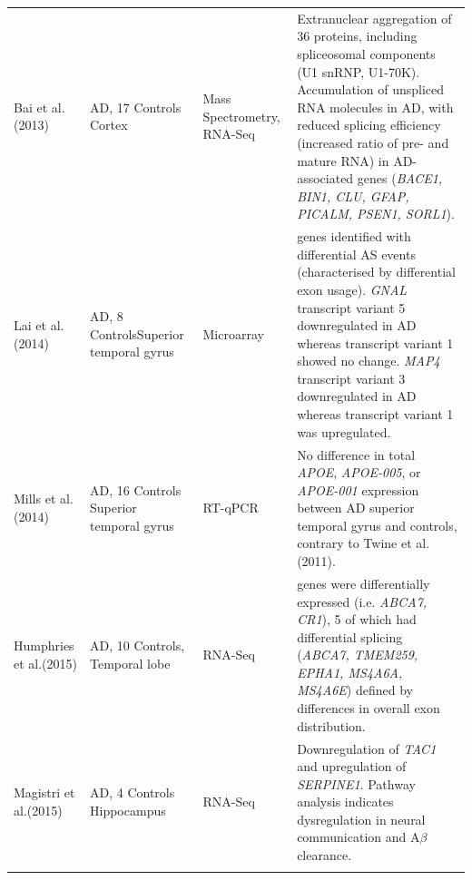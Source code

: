 \begin{landscape}
\begin{longtable}[c]{p{3cm}p{4cm}p{3cm}p{16cm}}
		\centering Bai et al. \newline(2013)\cite{Bai2013} &
		\centering 18 AD, 17 Controls \newline Cortex &
		\centering Mass Spectrometry, RNA-Seq &
		\tabitem Extranuclear aggregation of 36 proteins, including spliceosomal components (U1 snRNP, U1-70K). \newline
		\tabitem Accumulation of unspliced RNA molecules in AD, with reduced splicing efficiency (increased ratio of pre- and mature RNA) in AD-associated genes (\textit{BACE1, BIN1, CLU, GFAP, PICALM, PSEN1, SORL1}).  \\
		\hdashline[0.5pt/5pt]
		
		\centering  Lai et al. \newline(2014)\cite{Lai2014} &
		\centering 8 AD, 8 Controls\newline Superior temporal gyrus &
		\centering Microarray &
		\tabitem 22 genes identified with differential AS events (characterised by differential exon usage). \newline  
		\tabitem \textit{GNAL} transcript variant 5 downregulated in AD whereas transcript variant 1 showed no change. \newline 
		\tabitem \textit{MAP4} transcript variant 3 downregulated in AD whereas transcript variant 1 was upregulated.\\
		\hdashline[0.5pt/5pt]
		
		\centering Mills et al. (2014)\cite{Mills2014} &
		\centering 14 AD, 16 Controls \newline Superior temporal gyrus &
		\centering RT-qPCR &
		\tabitem No difference in total \textit{APOE}, \textit{APOE-005}, or \textit{APOE-001} expression between AD superior temporal gyrus and controls, contrary to Twine et al. (2011)\cite{Twine2011}. \\
		
		\centering Humphries et al.(2015)\cite{Humphries2015} &
		\centering 10 AD, 10 Controls, \newline Temporal lobe &
		\centering RNA-Seq &
		\tabitem 9 genes were differentially expressed (i.e. \textit{ABCA7, CR1}), 5 of which had differential splicing (\textit{ABCA7, TMEM259, EPHA1, MS4A6A, MS4A6E}) defined by differences in overall exon distribution. \\
		
		\centering Magistri et al.(2015)\cite{Magistri2015} &
		\centering 4 AD, 4 Controls \newline Hippocampus &
		\centering RNA-Seq &
		\tabitem Downregulation of \textit{TAC1} and upregulation of \textit{SERPINE1}. \newline 
		\tabitem Pathway analysis indicates dysregulation in neural communication and A$\beta$ clearance. \\		
		\hdashline[0.5pt/5pt]
		

\end{longtable}
\end{landscape}
